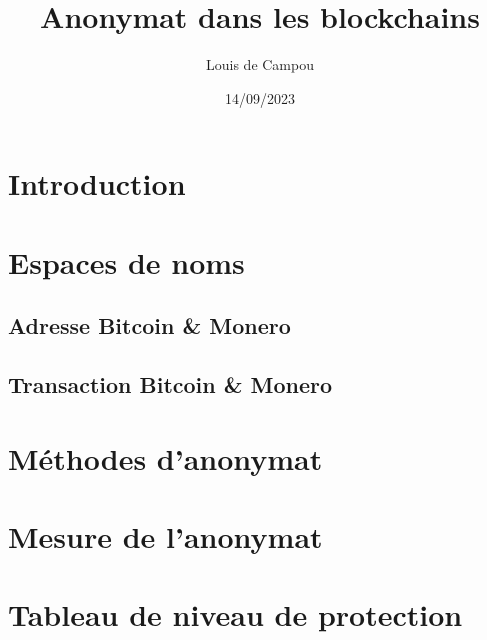 \documentclass{article}
\title{Anonymat dans les blockchains}
\author{Louis de Campou}
\date{14/09/2023}
\begin{document}
\maketitle

\newpage
\tableofcontents

\newpage
\section{Introduction}


\section{Espaces de noms}


\subsection{Adresse Bitcoin \& Monero}

    
\subsection{Transaction Bitcoin \& Monero}


\section{Méthodes d'anonymat}


\section{Mesure de l'anonymat}


\section{Tableau de niveau de protection}


\clearpage 
\printglossaries 

\clearpage
\printbibliography
\end{document}
